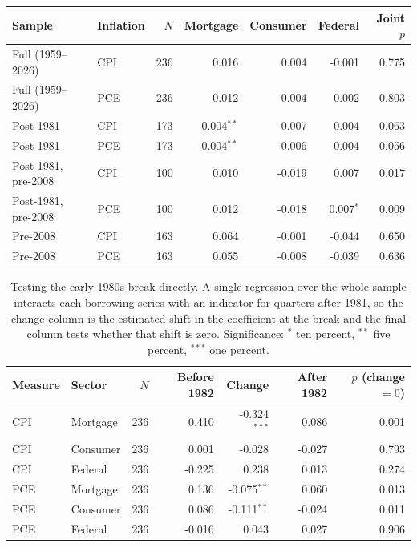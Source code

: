 \begin{table}[htbp]
\begin{tabular}{llrrrrr}
Sample & Inflation & $N$ & Mortgage & Consumer & Federal & Joint $p$ \\
\midrule
Full (1959--2026) & CPI & 236 & 0.016 & 0.004 & -0.001 & 0.775 \\
Full (1959--2026) & PCE & 236 & 0.012 & 0.004 & 0.002 & 0.803 \\
Post-1981 & CPI & 173 & 0.004$^{**}$ & -0.007 & 0.004 & 0.063 \\
Post-1981 & PCE & 173 & 0.004$^{**}$ & -0.006 & 0.004 & 0.056 \\
Post-1981, pre-2008 & CPI & 100 & 0.010 & -0.019 & 0.007 & 0.017 \\
Post-1981, pre-2008 & PCE & 100 & 0.012 & -0.018 & 0.007$^{*}$ & 0.009 \\
Pre-2008 & CPI & 163 & 0.064 & -0.001 & -0.044 & 0.650 \\
Pre-2008 & PCE & 163 & 0.055 & -0.008 & -0.039 & 0.636 \\
\bottomrule
\end{tabular}
\end{table}


\begin{table}[htbp]
\centering
\setlength{\belowcaptionskip}{8pt}
\small
\caption{Testing the early-1980s break directly. A single regression over the whole sample interacts each borrowing series with an indicator for quarters after 1981, so the change column is the estimated shift in the coefficient at the break and the final column tests whether that shift is zero. Significance: $^{*}$ ten percent, $^{**}$ five percent, $^{***}$ one percent.}
\label{tab:creditbreak}
\begin{tabular}{llrrrrr}
\toprule
Measure & Sector & $N$ & Before 1982 & Change & After 1982 & $p$ (change $=0$) \\
\midrule
CPI & Mortgage & 236 & 0.410 & -0.324$^{***}$ & 0.086 & 0.001 \\
CPI & Consumer & 236 & 0.001 & -0.028 & -0.027 & 0.793 \\
CPI & Federal & 236 & -0.225 & 0.238 & 0.013 & 0.274 \\
PCE & Mortgage & 236 & 0.136 & -0.075$^{**}$ & 0.060 & 0.013 \\
PCE & Consumer & 236 & 0.086 & -0.111$^{**}$ & -0.024 & 0.011 \\
PCE & Federal & 236 & -0.016 & 0.043 & 0.027 & 0.906 \\
\bottomrule
\end{tabular}
\end{table}
